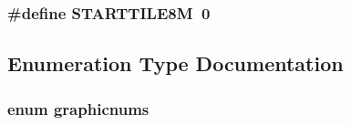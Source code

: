 \label{GFXE__WL6_8H_a63a36c8955b74ee16ba0fc61f4d62478}
\hypertarget{GFXE__WL6_8H_a56df7bfae7e081f1fe22c67f356c0f12}{
\subsubsection[{STARTTILE8M}]{\setlength{\rightskip}{0pt plus 5cm}\#define STARTTILE8M~0}}
\label{GFXE__WL6_8H_a56df7bfae7e081f1fe22c67f356c0f12}


\subsection{Enumeration Type Documentation}
\hypertarget{GFXE__WL6_8H_a82d35df9a0074a553383c0776300fa10}{
\subsubsection[{graphicnums}]{\setlength{\rightskip}{0pt plus 5cm}enum {\bf graphicnums}}}
\label{GFXE__WL6_8H_a82d35df9a0074a553383c0776300fa10}
